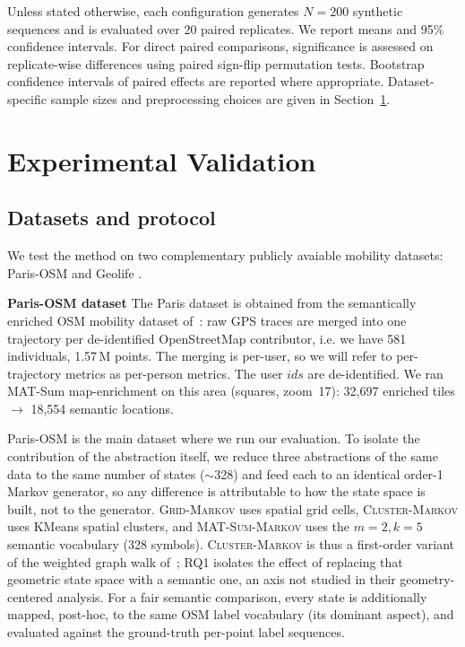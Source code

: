 \documentclass[sigconf,nonacm]{acmart}
\begin{document}
Unless stated otherwise, each configuration generates $N=200$ synthetic sequences and is evaluated over 20 paired replicates.
We report means and 95\% confidence intervals. For direct paired comparisons, significance is assessed on replicate-wise differences using paired sign-flip permutation tests. Bootstrap confidence intervals of paired effects are reported where appropriate. Dataset-specific sample sizes and preprocessing choices are given in Section~\ref{sec:experiments}.




\section{Experimental Validation}
\label{sec:experiments}


\subsection{Datasets and protocol}

We test the method on two complementary publicly avaiable mobility datasets: Paris-OSM \cite{pugliese2025}  and Geolife \cite{geolife}.

\textbf{Paris-OSM dataset}
The Paris dataset is obtained from the semantically enriched OSM mobility dataset of~\cite{pugliese2025}: raw GPS traces are merged into one trajectory per de-identified OpenStreetMap contributor, i.e. we have 581
individuals, 1.57\,M points. The merging is per-user, so we will refer to per-trajectory metrics as per-person metrics. The user $ids$ are de-identified.
We ran MAT-Sum map-enrichment on this area (squares, zoom~17): 32{,}697 enriched tiles
$\rightarrow$ 18{,}554 semantic locations.

Paris-OSM is the main dataset where we run our evaluation.
To isolate the contribution of the abstraction itself, we reduce three abstractions of the same data to the same number of states ($\sim$328) and feed each to an identical order-1 Markov generator, so any difference is attributable to how the state space is built, not to the generator. \textsc{Grid-Markov} uses spatial grid cells, \textsc{Cluster-Markov} uses KMeans spatial clusters, and \textsc{MAT-Sum-Markov} uses the $m{=}2,k{=}5$ semantic vocabulary (328 symbols). \textsc{Cluster-Markov} is thus a first-order variant of the weighted graph walk of~\cite{kavalionak2026}; RQ1 isolates the effect of replacing that geometric state space with a semantic one, an axis not studied in their geometry-centered analysis. For a fair semantic comparison, every state is additionally mapped, post-hoc, to the same OSM label vocabulary (its dominant aspect), and evaluated against the ground-truth per-point label sequences.
\end{document}
